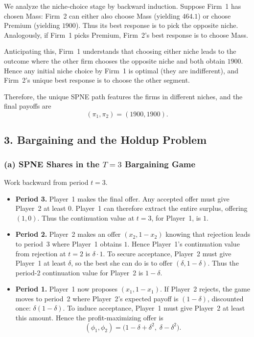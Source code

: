 \documentclass[12pt,a4paper]{article}
\begin{document}
We analyze the niche-choice stage by backward induction. Suppose Firm~1 has chosen Mass:
Firm~2 can either also choose Mass (yielding \(464.1\)) or choose Premium (yielding \(1900\)).
Thus its best response is to pick the opposite niche. Analogously, if Firm~1 picks Premium,
Firm~2's best response is to choose Mass.

Anticipating this, Firm~1 understands that choosing either niche leads to the outcome where
the other firm chooses the opposite niche and both obtain \(1900\). Hence any initial niche
choice by Firm~1 is optimal (they are indifferent), and Firm~2's unique best response is to
choose the other segment.

Therefore, the unique SPNE path features the firms in different niches, and the final payoffs are
\[
  (\pi_1,\pi_2) = (1900,1900).
\]

\bigskip

\subsection*{3. Bargaining and the Holdup Problem}

\subsubsection*{(a) SPNE Shares in the \(T=3\) Bargaining Game}

Work backward from period \(t=3\).
\begin{itemize}
  \item \textbf{Period 3.} Player~1 makes the final offer. Any accepted offer must give Player~2
        at least \(0\). Player~1 can therefore extract the entire surplus, offering
        \((1,0)\). Thus the continuation value at \(t=3\), for Player~1, is \(1\).
  \item \textbf{Period 2.} Player~2 makes an offer \((x_2,1-x_2)\) knowing that rejection leads to
        period~3 where Player~1 obtains \(1\). Hence Player~1's continuation value from rejection
        at \(t=2\) is \(\delta \cdot 1\). To secure acceptance, Player~2 must give Player~1 at least
        \(\delta\), so the best she can do is to offer \((\delta,1-\delta)\). Thus the period-2
        continuation value for Player~2 is \(1-\delta\).
  \item \textbf{Period 1.} Player~1 now proposes \((x_1,1-x_1)\). If Player~2 rejects, the game
        moves to period~2 where Player~2's expected payoff is \((1-\delta)\), discounted once:
        \(\delta(1-\delta)\). To induce acceptance, Player~1 must give Player~2 at least this
        amount. Hence the profit-maximizing offer is
        \[
          (\phi_1,\phi_2) = \bigl(1-\delta+\delta^2,\; \delta-\delta^2\bigr).
        \]
\end{itemize}
\end{document}
